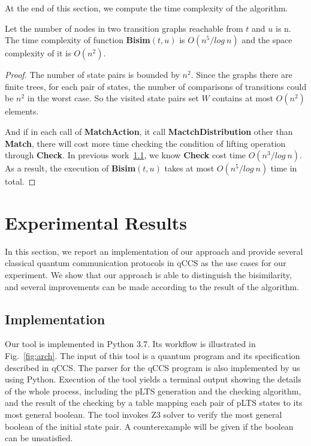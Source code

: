 \documentclass[a4paper,UKenglish,cleveref, autoref]{lipics-v2019}
\begin{document}
At the end of this section, we compute the time complexity of the algorithm.

\begin{theorem}[Complexity]
Let the number of nodes in two transition graphs reachable from $t$ and $u$ is n. The time complexity of function \textbf{Bisim}$(t,u)$ is $O(n^5/log\ n)$ and the space complexity of it is $O(n^2)$.
\end{theorem}
\begin{proof}
 The number of state pairs is bounded by $n^2$. Since the graphs there are finite trees, for each pair of states, the number of comparisons of transitions could be $n^2$ in the worst case. So the visited state pairs set $W$ contains at most $O(n^2)$ elements.

And if in each call of \textbf{MatchAction}, it call \textbf{MactchDistribution} other than \textbf{Match}, there will cost more time checking the condition of lifting operation through \textbf{Check}. In previous work~\ref{}, we know \textbf{Check} cost time $O(n^3/log\ n)$. As a result, the execution of \textbf{Bisim}$(t,u)$ takes at most $O(n^5/log\ n)$ time in total.
\end{proof}

\section{Experimental Results}
In this section, we report an implementation of our approach and provide several classical quantum communication protocols in qCCS as the use cases for our experiment. We show that our approach is able to distinguish the bisimilarity, and several improvements can be made according to the result of the algorithm.
\subsection{Implementation}
Our tool is implemented in Python 3.7. Its workflow is illustrated in Fig.~\ref{fig:arch}. The input of this tool is a quantum program and its specification described in qCCS. The parser for the qCCS program is also implemented by us using Python. Execution of the tool yields a terminal output showing the details of the whole process, including the pLTS generation and the checking algorithm, and the result of the checking by a table mapping each pair of pLTS states to its most general boolean. The tool invokes Z3 solver to verify the most general boolean of the initial state pair. A counterexample will be given if the boolean can be unsatisfied.
\end{document}
